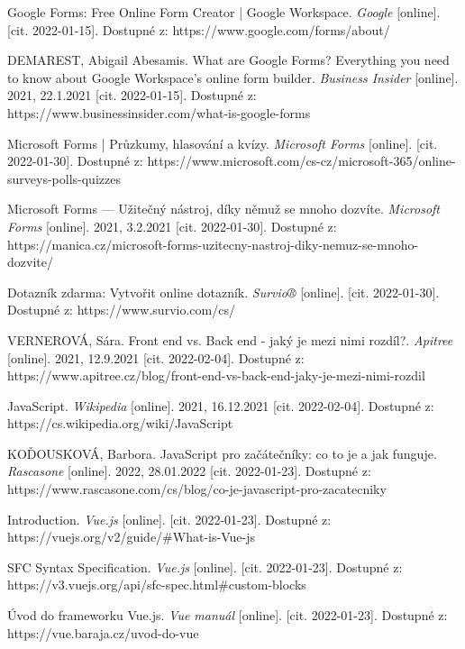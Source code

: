 \begin{thebibliography}{55}

Google Forms: Free Online Form Creator | Google Workspace. \textit{Google} [online]. [cit. 2022-01-15]. Dostupné z: https://www.google.com/forms/about/

DEMAREST, Abigail Abesamis. What are Google Forms? Everything you need to know about Google Workspace's online form builder. \textit{Business Insider} [online]. 2021, 22.1.2021 [cit. 2022-01-15]. Dostupné z: https://www.businessinsider.com/what-is-google-forms

Microsoft Forms | Průzkumy, hlasování a kvízy. \textit{Microsoft Forms} [online]. [cit. 2022-01-30]. Dostupné z: https://www.microsoft.com/cs-cz/microsoft-365/online-surveys-polls-quizzes

Microsoft Forms --- Užitečný nástroj, díky němuž se mnoho dozvíte. \textit{Microsoft Forms} [online]. 2021, 3.2.2021 [cit. 2022-01-30]. Dostupné z: https://manica.cz/microsoft-forms-uzitecny-nastroj-diky-nemuz-se-mnoho-dozvite/

Dotazník zdarma: Vytvořit online dotazník. \textit{Survio®} [online]. [cit. 2022-01-30]. Dostupné z: https://www.survio.com/cs/

VERNEROVÁ, Sára. Front end vs. Back end - jaký je mezi nimi rozdíl?. \textit{Apitree} [online]. 2021, 12.9.2021 [cit. 2022-02-04]. Dostupné z: https://www.apitree.cz/blog/front-end-vs-back-end-jaky-je-mezi-nimi-rozdil

JavaScript. \textit{Wikipedia} [online]. 2021, 16.12.2021 [cit. 2022-02-04]. Dostupné z: https://cs.wikipedia.org/wiki/JavaScript

KOĎOUSKOVÁ, Barbora. JavaScript pro začátečníky: co to je a jak funguje. \textit{Rascasone} [online]. 2022, 28.01.2022 [cit. 2022-01-23]. Dostupné z: https://www.rascasone.com/cs/blog/co-je-javascript-pro-zacatecniky

Introduction. \textit{Vue.js} [online]. [cit. 2022-01-23]. Dostupné z: https://vuejs.org/v2/guide/\#What-is-Vue-js

SFC Syntax Specification. \textit{Vue.js} [online]. [cit. 2022-01-23]. Dostupné z: https://v3.vuejs.org/api/sfc-spec.html\#custom-blocks

Úvod do frameworku Vue.js. \textit{Vue manuál} [online]. [cit. 2022-01-23]. Dostupné z: https://vue.baraja.cz/uvod-do-vue


\end{thebibliography}
